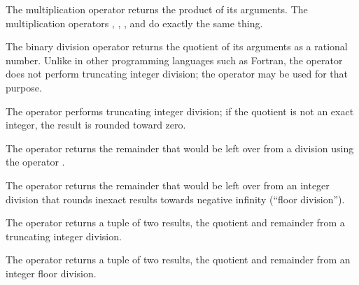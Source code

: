 The multiplication operator \EXP{\cdot} returns the product of its arguments.
The multiplication operators \EXP{\times}, \EXP{\boxdot}, \EXP{\boxtimes}, and \EXP{\dottimes} do exactly the same thing.




The binary division operator \EXP{/} returns the quotient of its arguments
as a rational number.  Unlike in other programming languages such as Fortran,
the operator \EXP{/} does not perform truncating integer division;
the operator \EXP{\div} may be used for that purpose.



The operator \EXP{\div} performs truncating integer division; if the quotient is
not an exact integer, the result is rounded toward zero.

The operator  returns the remainder that would be left over from a division
using the operator \EXP{\div}.

The operator  returns the remainder that would be left over from an integer division
that rounds inexact results towards negative infinity (``floor division'').

The operator  returns a tuple of two results, the quotient and remainder
from a truncating integer division.

The operator  returns a tuple of two results, the quotient and remainder
from an integer floor division.


